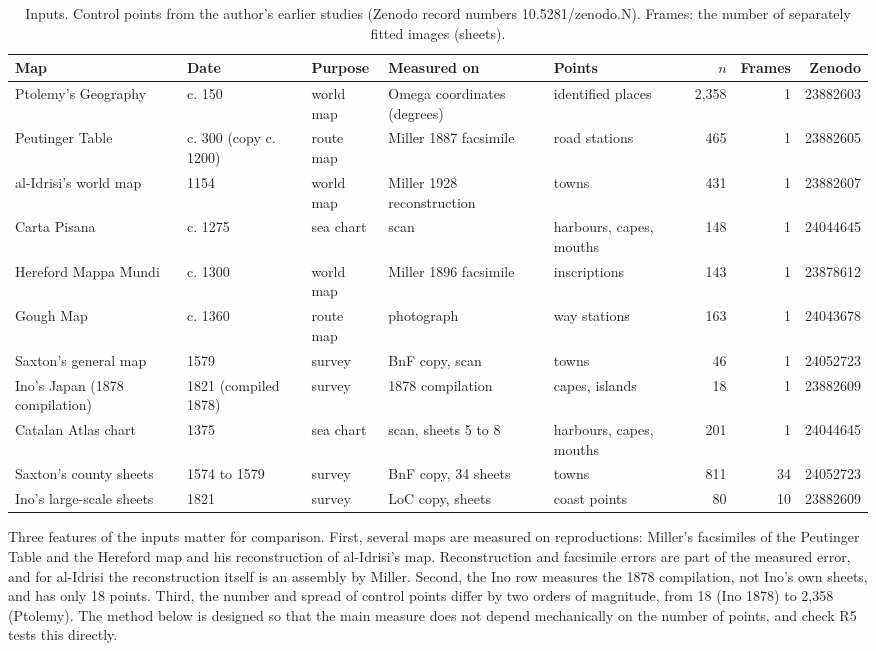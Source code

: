 \documentclass[11pt,a4paper]{article}
\begin{document}
\begin{table}[tbp]\centering\scriptsize\caption{Inputs. Control points from the author's earlier studies (Zenodo record numbers 10.5281/zenodo.N). Frames: the number of separately fitted images (sheets).}\label{tab:inputs}\setlength{\tabcolsep}{3pt}\begin{tabular}{p{2.9cm}p{1.9cm}p{1.2cm}p{2.5cm}p{2.3cm}rrr}\toprule Map & Date & Purpose & Measured on & Points & $n$ & Frames & Zenodo\\\midrule
Ptolemy's Geography & c. 150 & world map & Omega coordinates (degrees) & identified places & 2,358 & 1 & \footnotesize{23882603}\\
Peutinger Table & c. 300 (copy c. 1200) & route map & Miller 1887 facsimile & road stations & 465 & 1 & \footnotesize{23882605}\\
al-Idrisi's world map & 1154 & world map & Miller 1928 reconstruction & towns & 431 & 1 & \footnotesize{23882607}\\
Carta Pisana & c. 1275 & sea chart & scan & harbours, capes, mouths & 148 & 1 & \footnotesize{24044645}\\
Hereford Mappa Mundi & c. 1300 & world map & Miller 1896 facsimile & inscriptions & 143 & 1 & \footnotesize{23878612}\\
Gough Map & c. 1360 & route map & photograph & way stations & 163 & 1 & \footnotesize{24043678}\\
Saxton's general map & 1579 & survey & BnF copy, scan & towns & 46 & 1 & \footnotesize{24052723}\\
Ino's Japan (1878 compilation) & 1821 (compiled 1878) & survey & 1878 compilation & capes, islands & 18 & 1 & \footnotesize{23882609}\\
\midrule
Catalan Atlas chart & 1375 & sea chart & scan, sheets 5 to 8 & harbours, capes, mouths & 201 & 1 & \footnotesize{24044645}\\
Saxton's county sheets & 1574 to 1579 & survey & BnF copy, 34 sheets & towns & 811 & 34 & \footnotesize{24052723}\\
Ino's large-scale sheets & 1821 & survey & LoC copy, sheets & coast points & 80 & 10 & \footnotesize{23882609}\\
\bottomrule\end{tabular}\end{table}

Three features of the inputs matter for comparison. First, several maps are measured on reproductions: Miller's facsimiles of the Peutinger Table and the Hereford map and his reconstruction of al-Idrisi's map. Reconstruction and facsimile errors are part of the measured error, and for al-Idrisi the reconstruction itself is an assembly by Miller. Second, the Ino row measures the 1878 compilation, not Ino's own sheets, and has only 18 points. Third, the number and spread of control points differ by two orders of magnitude, from 18 (Ino 1878) to 2,358 (Ptolemy). The method below is designed so that the main measure does not depend mechanically on the number of points, and check R5 tests this directly.
\end{document}
